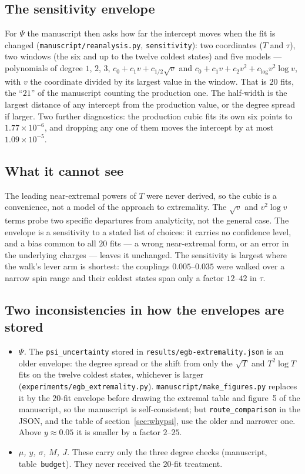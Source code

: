 \documentclass[11pt,a4paper]{article}
\newcommand{\q}[1]{\subsection*{\color{accent}#1}}
\begin{document}
\q{The sensitivity envelope}

For $\Psi$ the manuscript then asks how far the intercept moves when the fit
is changed (\texttt{manuscript/reanalysis.py}, \texttt{sensitivity}): two
coordinates ($T$ and $\tau$), two windows (the six and up to the twelve coldest
states) and five models --- polynomials of degree $1$, $2$, $3$,
$c_0+c_1v+c_{1/2}\sqrt v$ and $c_0+c_1v+c_2v^2+c_{\log}v^2\log v$, with $v$ the
coordinate divided by its largest value in the window. That is $20$ fits,
the ``$21$'' of the manuscript counting the production one. The half-width is the
largest distance of any intercept from the production value, or the degree
spread if larger. Two further diagnostics: the production cubic fits its own six
points to $1.77\times10^{-6}$, and dropping any one of them moves the intercept
by at most $1.09\times10^{-5}$.

\q{What it cannot see}

The leading near-extremal powers of $T$ were never derived, so the cubic is a
convenience, not a model of the approach to extremality. The $\sqrt v$ and
$v^2\log v$ terms probe two specific departures from analyticity, not the
general case. The envelope is a sensitivity to a stated list of choices: it
carries no confidence level, and a bias common to all $20$ fits --- a wrong
near-extremal form, or an error in the underlying charges --- leaves it
unchanged. The sensitivity is largest where the walk's lever arm is shortest:
the couplings $0.005$--$0.035$ were walked over a narrow spin range and their
coldest states span only a factor $12$--$42$ in $\tau$.

\q{Two inconsistencies in how the envelopes are stored}

\begin{itemize}\itemsep3pt
  \item \emph{$\Psi$.} The \texttt{psi\_uncertainty} stored in
  \texttt{results/egb-extremality.json} is an older envelope: the degree spread
  or the shift from only the $\sqrt T$ and $T^2\log T$ fits on the twelve
  coldest states, whichever is larger (\texttt{experiments/egb\_extremality.py}).
  \texttt{manuscript/make\_figures.py} replaces it by the $20$-fit envelope
  before drawing the extremal table and figure~5 of the manuscript, so the manuscript is
  self-consistent; but \texttt{route\_comparison} in the JSON, and the table
  of section~\ref{sec:whypsi}, use the older and narrower one. Above
  $y\approx0.05$ it is smaller by a factor $2$--$25$.
  \item \emph{$\mu$, $y$, $\sigma$, $M$, $J$.} These carry only the three
  degree checks (manuscript, table~\texttt{budget}). They never received the
  $20$-fit treatment.
\end{itemize}
\end{document}
